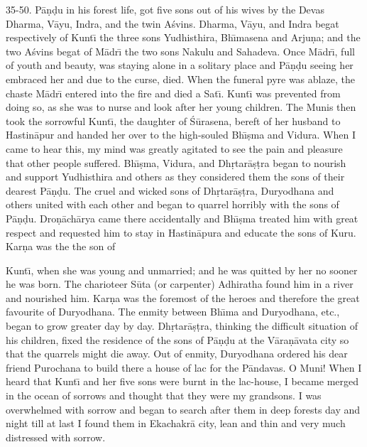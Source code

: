 35-50. P\=a\d{n}\d{d}u in his forest life, got five sons out of his wives by the Devas Dharma, V\=ayu, Indra, and the twin A\'svins. Dharma, V\=ayu, and Indra begat respectively of Kunt\={\i} the three sons Yudhisthira, Bh\={\i}masena and Arju\d{n}a; and the two A\'svins begat of M\=adr\={\i} the two sons Nakulu and Sahadeva. Once M\=adr\={\i}, full of youth and beauty, was staying alone in a solitary place and P\=a\d{n}\d{d}u seeing her embraced her and due to the curse, died. When the funeral pyre was ablaze, the chaste M\=adr\={\i} entered into the fire and died a Sat\={\i}. Kunt\={\i} was prevented from doing so, as she was to nurse and look after her young children. The Munis then took the sorrowful Kunt\={\i}, the daughter of \'S\=urasena, bereft of her husband to Hastin\=apur and handed her over to the high-souled Bh\={\i}\d{s}ma and Vidura. When I came to hear this, my mind was greatly agitated to see the pain and pleasure that other people suffered. Bh\={\i}\d{s}ma, Vidura, and Dh\d{r}tar\=a\d{s}\d{t}ra began to nourish and support Yudhisthira and others as they considered them the sons of their dearest P\=a\d{n}\d{d}u. The cruel and wicked sons of Dh\d{r}tar\=a\d{s}\d{t}ra, Duryodhana and others united with each other and began to quarrel horribly with the sons of P\=a\d{n}\d{d}u. Dro\d{n}\=ach\=arya came there accidentally and Bh\={\i}\d{s}ma treated him with great respect and requested him to stay in Hastin\=apura and educate the sons of Kuru. Kar\d{n}a was the the son of

Kunt\={\i}, when she was young and unmarried; and he was quitted by her no sooner he was born. The charioteer S\=uta (or carpenter) Adhiratha found him in a river and nourished him. Kar\d{n}a was the foremost of the heroes and therefore the great favourite of Duryodhana. The enmity between Bh\={\i}ma and Duryodhana, etc., began to grow greater day by day. Dh\d{r}tar\=a\d{s}\d{t}ra, thinking the difficult situation of his children, fixed the residence of the sons of P\=a\d{n}\d{d}u at the V\=ara\d{n}\=avata city so that the quarrels might die away. Out of enmity, Duryodhana ordered his dear friend Purochana to build there a house of lac for the P\=andavas. O Muni! When I heard that Kunt\={\i} and her five sons were burnt in the lac-house, I became merged in the ocean of sorrows and thought that they were my grandsons. I was overwhelmed with sorrow and began to search after them in deep forests day and night till at last I found them in Ekachakr\=a city, lean and thin and very much distressed with sorrow.


